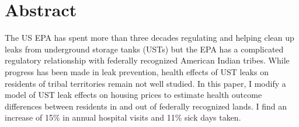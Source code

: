 \documentclass[12pt]{article}
\begin{document}
{}


% 






\section{Abstract}

The US EPA has spent more than three decades regulating and helping clean up leaks from underground storage tanks (USTs) but the EPA has a complicated regulatory relationship with federally recognized American Indian tribes. While progress has been made in leak prevention, health effects of UST leaks on residents of tribal territories remain not well studied. In this paper, I modify a model of UST leak effects on housing prices to estimate health outcome differences between residents in and out of federally recognized lands. I find an increase of 15\% in annual hospital visits and 11\% sick days taken.
\end{document}
